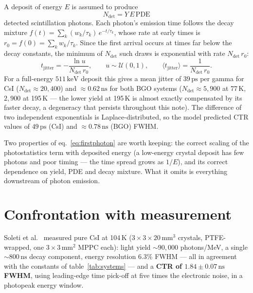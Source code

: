 \documentclass[11pt,a4paper]{article}
\newcommand{\Ndet}{N_{\mathrm{det}}}
\newcommand{\ns}{\,\mathrm{ns}}
\newcommand{\ps}{\,\mathrm{ps}}
\newcommand{\keV}{\,\mathrm{keV}}
\begin{document}
A deposit of energy $E$ is assumed to produce
\begin{equation}
  \Ndet = Y \, E \, \mathrm{PDE}
\end{equation}
detected scintillation photons. Each photon's emission time follows the decay mixture
$f(t) = \sum_k (w_k/\tau_k)\, e^{-t/\tau_k}$, whose rate at early times is
$r_0 = f(0) = \sum_k w_k/\tau_k$. Since the first arrival occurs at times far below the decay
constants, the minimum of $\Ndet$ such draws is exponential with rate $\Ndet\, r_0$:
\begin{equation}
  t_{\mathrm{jitter}} = -\frac{\ln u}{\Ndet\, r_0}, \qquad u \sim \mathcal{U}(0,1),
  \qquad \langle t_{\mathrm{jitter}} \rangle = \frac{1}{\Ndet\, r_0}.
  \label{eq:firstphoton}
\end{equation}
For a full-energy $511\keV$ deposit this gives a mean jitter of $39\ps$ per gamma for CsI
($\Ndet \approx 20{,}400$) and ${\approx}0.62\ns$ for both BGO systems
($\Ndet \approx 5{,}900$ at 77\,K, $2{,}900$ at 195\,K --- the lower yield at 195\,K is almost
exactly compensated by its faster decay, a degeneracy that persists throughout this note).
The difference of two independent exponentials is Laplace-distributed, so the model predicted
CTR values of $49\ps$ (CsI) and ${\approx}0.78\ns$ (BGO) FWHM.

Two properties of eq.~\eqref{eq:firstphoton} are worth keeping: the correct scaling of the
photostatistics term with deposited energy (a low-energy crystal deposit has few photons and
poor timing --- the time spread grows as $1/E$), and its correct dependence on yield, PDE and
decay mixture. What it omits is everything downstream of photon emission.

\section{Confrontation with measurement}
\label{sec:measurement}

Soleti et al.~\cite{Soleti2024} measured pure CsI at 104\,K
($3\times3\times20$\,mm$^3$ crystals, PTFE-wrapped, one $3\times3$\,mm$^2$ MPPC each):
light yield ${\sim}90{,}000$ photons/MeV, a single ${\sim}800\ns$ decay component, energy
resolution $6.3\%$ FWHM --- all in agreement with the constants of table~\ref{tab:systems} ---
and a \textbf{CTR of $1.84 \pm 0.07\ns$ FWHM}, using leading-edge time pick-off at five times
the electronic noise, in a photopeak energy window.
\end{document}
